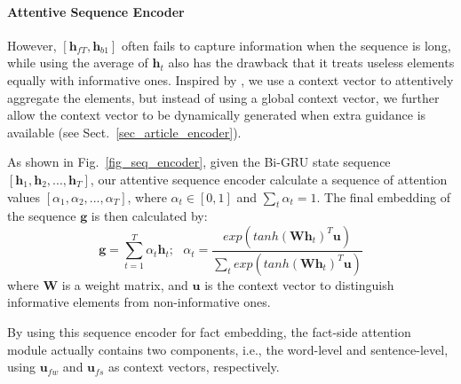 \paragraph{Attentive Sequence Encoder}
\label{sec_att_seq_encoder}
However, $[\mathbf{h}_{fT}, \mathbf{h}_{b1}]$ often fails to capture  information when the sequence is long, while using the average of $\mathbf{h}_t$ also has the drawback that it treats useless elements equally with informative ones. 
%
Inspired by \cite{yang2016hierarchical}, we use a context vector to attentively aggregate the elements, but instead of using a global context vector, we further allow the context vector to be dynamically generated when extra guidance is available (see Sect.~\ref{sec_article_encoder}).


As shown in Fig.~\ref{fig_seq_encoder}, given the Bi-GRU state sequence $[\mathbf{h}_1, \mathbf{h}_2, ..., \mathbf{h}_T]$, 
our attentive sequence encoder calculate a sequence of attention values $[\alpha_1, \alpha_2, ..., \alpha_T]$, 
where $\alpha_t \in [0, 1]$ and $\sum_t{\alpha_t}=1$. The final embedding of the sequence $\mathbf{g}$ is then calculated by:
% 
\begin{equation}
\mathbf{g} = \sum_{t=1}^{T}{\alpha_t \mathbf{h}_t};\ \ \ 
\alpha_t=\frac{exp(tanh(\mathbf{W} \mathbf{h}_t)^T \mathbf{u})}{\sum_t{exp(tanh(\mathbf{W} \mathbf{h}_t)^T \mathbf{u})}}
\label{seq_embed}
\end{equation}
where $\mathbf{W}$ is a weight matrix, and $\mathbf{u}$ is the context vector to distinguish informative elements from non-informative ones. 

By using this sequence encoder for fact embedding, the fact-side attention module actually contains two components, i.e., the word-level and sentence-level, using $\mathbf{u}_{fw}$ and $\mathbf{u}_{fs}$ as  context vectors, respectively.


